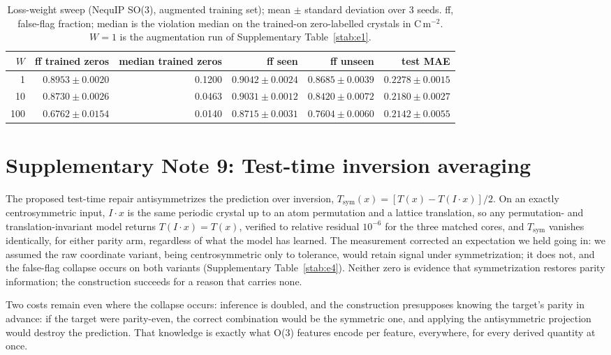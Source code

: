 \begin{table}[htbp]
\centering
\caption{Loss-weight sweep (NequIP SO(3), augmented training set); mean $\pm$ standard deviation over 3 seeds. ff, false-flag fraction; median is the violation median on the trained-on zero-labelled crystals in C\,m$^{-2}$. $W = 1$ is the augmentation run of Supplementary Table~\ref{stab:e1}.}
\label{stab:h3}
\fontsize{7bp}{8.5bp}\selectfont
\begin{tabular}{rrrrrr}
\toprule
$W$ & ff trained zeros & median trained zeros & ff seen & ff unseen & test MAE \\
\midrule
1 & $0.8953 \pm 0.0020$ & 0.1200 & $0.9042 \pm 0.0024$ & $0.8685 \pm 0.0039$ & $0.2278 \pm 0.0015$ \\
10 & $0.8730 \pm 0.0026$ & 0.0463 & $0.9031 \pm 0.0012$ & $0.8420 \pm 0.0072$ & $0.2180 \pm 0.0027$ \\
100 & $0.6762 \pm 0.0154$ & 0.0140 & $0.8715 \pm 0.0031$ & $0.7604 \pm 0.0060$ & $0.2142 \pm 0.0055$ \\
\bottomrule
\end{tabular}

\end{table}

\section*{Supplementary Note 9: Test-time inversion averaging}

The proposed test-time repair antisymmetrizes the prediction over inversion, $T_{\mathrm{sym}}(x) = [T(x) - T(I\!\cdot\!x)]/2$. On an exactly centrosymmetric input, $I\!\cdot\!x$ is the same periodic crystal up to an atom permutation and a lattice translation, so any permutation- and translation-invariant model returns $T(I\!\cdot\!x) = T(x)$, verified to relative residual $10^{-6}$ for the three matched cores, and $T_{\mathrm{sym}}$ vanishes identically, for either parity arm, regardless of what the model has learned. The measurement corrected an expectation we held going in: we assumed the raw coordinate variant, being centrosymmetric only to tolerance, would retain signal under symmetrization; it does not, and the false-flag collapse occurs on both variants (Supplementary Table~\ref{stab:e4}). Neither zero is evidence that symmetrization restores parity information; the construction succeeds for a reason that carries none.

Two costs remain even where the collapse occurs: inference is doubled, and the construction presupposes knowing the target's parity in advance: if the target were parity-even, the correct combination would be the symmetric one, and applying the antisymmetric projection would destroy the prediction. That knowledge is exactly what O(3) features encode per feature, everywhere, for every derived quantity at once.


